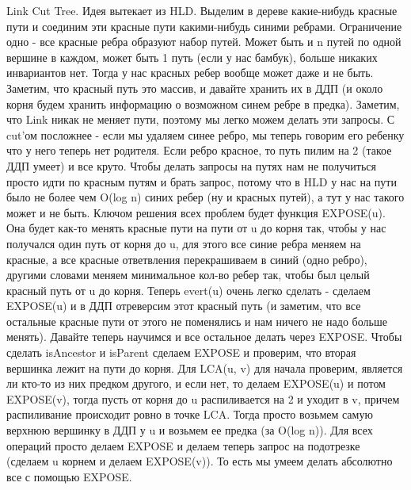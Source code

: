 Link Cut Tree.
Идея вытекает из HLD. Выделим в дереве какие-нибудь красные пути и соединим эти красные пути какими-нибудь синими ребрами. Ограничение одно - все красные ребра образуют набор путей. Может быть и n путей по одной вершине в каждом, может быть 1 путь (если у нас бамбук), больше никаких инвариантов нет. Тогда у нас красных ребер вообще может даже и не быть. Заметим, что красный путь это массив, и давайте хранить их в ДДП (и около корня будем хранить информацию о возможном синем ребре в предка). Заметим, что Link никак не меняет пути, поэтому мы легко можем делать эти запросы. С cut'ом посложнее - если мы удаляем синее ребро, мы теперь говорим его ребенку что у него теперь нет родителя. Если ребро красное, то путь пилим на 2 (такое ДДП умеет) и все круто. Чтобы делать запросы на путях нам не получиться просто идти по красным путям и брать запрос, потому что в HLD у нас на пути было не более чем O(log n) синих ребер (ну и красных путей), а тут у нас такого может и не быть. Ключом решения всех проблем будет функция EXPOSE(u). Она будет как-то менять красные пути на пути от u до корня так, чтобы у нас получался один путь от корня до u, для этого все синие ребра меняем на красные, а все красные ответвления перекрашиваем в синий (одно ребро), другими словами меняем минимальное кол-во ребер так, чтобы был целый красный путь от u до корня. Теперь evert(u) очень легко сделать - сделаем EXPOSE(u) и в ДДП отреверсим этот красный путь (и заметим, что все остальные красные пути от этого не поменялись и нам ничего не надо больше менять). Давайте теперь научимся и все остальное делать через EXPOSE. Чтобы сделать isAncestor и isParent сделаем EXPOSE и проверим, что вторая вершинка лежит на пути до корня. Для LCA(u, v) для начала проверим, является ли кто-то из них предком другого, и если нет, то делаем EXPOSE(u) и потом EXPOSE(v), тогда пусть от корня до u распиливается на 2 и уходит в v, причем распиливание происходит ровно в точке LCA. Тогда просто возьмем самую верхнюю вершинку в ДДП у u и возьмем ее предка (за O(log n)). Для всех операций просто делаем EXPOSE и делаем теперь запрос на подотрезке (сделаем u корнем и делаем EXPOSE(v)). То есть мы умеем делать абсолютно все с помощью EXPOSE.

